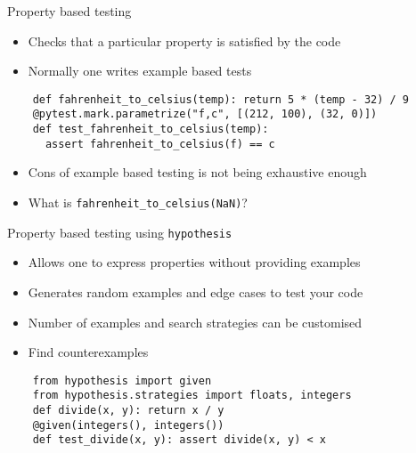 \documentclass[11pt,xcolor={dvipsnames},hyperref={pdftex,pdfpagemode=UseNone,hidelinks,pdfdisplaydoctitle=true},usepdftitle=false]{beamer}
\begin{document}
\begin{frame}[fragile]{Property based testing}
\label{property-based-testing}
\begin{itemize}
\item
  Checks that a particular property is satisfied by the code
\item
  Normally one writes example based tests
\end{itemize}

\begin{verbatim}
    def fahrenheit_to_celsius(temp): return 5 * (temp - 32) / 9
    @pytest.mark.parametrize("f,c", [(212, 100), (32, 0)])
    def test_fahrenheit_to_celsius(temp):
      assert fahrenheit_to_celsius(f) == c
\end{verbatim}

\begin{itemize}
\item
  Cons of example based testing is not being exhaustive enough
\item
  What is \texttt{fahrenheit\_to\_celsius(NaN)}?
\end{itemize}
\end{frame}

\begin{frame}[fragile]{Property based testing using \texttt{hypothesis}}
\label{property-based-testing-using-hypothesis}
\begin{itemize}
\item
  Allows one to express properties without providing examples
\item
  Generates random examples and edge cases to test your code
\item
  Number of examples and search strategies can be customised
\item
  Find counterexamples
\end{itemize}
\begin{verbatim}
    from hypothesis import given
    from hypothesis.strategies import floats, integers
    def divide(x, y): return x / y
    @given(integers(), integers())
    def test_divide(x, y): assert divide(x, y) < x
\end{verbatim}

\end{frame}
\end{document}
